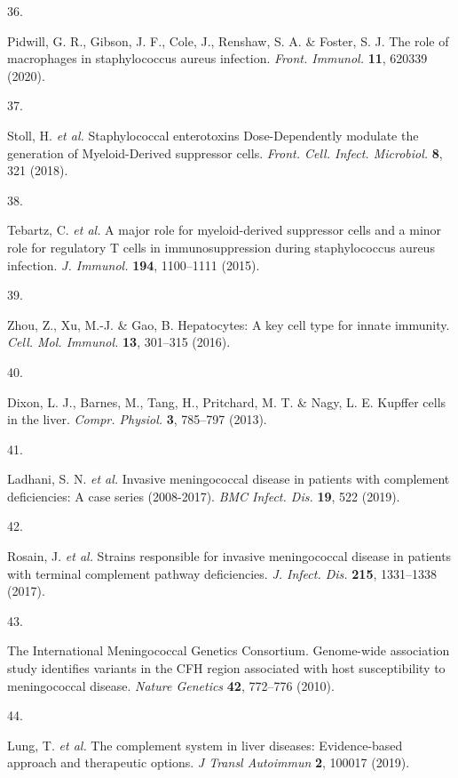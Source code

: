 \documentclass[
]{article}
\newlength{\cslhangindent}
\newlength{\csllabelwidth}
\newenvironment{CSLReferences}[2] %
 {\begin{list}{}{%
  \setlength{\itemindent}{0pt}
  \setlength{\leftmargin}{0pt}
  \setlength{\parsep}{0pt}
  \ifodd #1
   \setlength{\leftmargin}{\cslhangindent}
   \setlength{\itemindent}{-1\cslhangindent}
  \fi
  \setlength{\itemsep}{#2\baselineskip}}}
 {\end{list}}
\newcommand{\CSLLeftMargin}[1]{\parbox[t]{\csllabelwidth}{\strut#1\strut}}
\newcommand{\CSLRightInline}[1]{\parbox[t]{\linewidth - \csllabelwidth}{\strut#1\strut}}
\begin{document}
\begin{CSLReferences}{0}{0}
\CSLLeftMargin{36. }%
\CSLRightInline{Pidwill, G. R., Gibson, J. F., Cole, J., Renshaw, S. A.
\& Foster, S. J. The role of macrophages in staphylococcus aureus
infection. \emph{Front. Immunol.} \textbf{11}, 620339 (2020).}

\CSLLeftMargin{37. }%
\CSLRightInline{Stoll, H. \emph{et al.} Staphylococcal enterotoxins
{Dose-Dependently} modulate the generation of {Myeloid-Derived}
suppressor cells. \emph{Front. Cell. Infect. Microbiol.} \textbf{8}, 321
(2018).}

\CSLLeftMargin{38. }%
\CSLRightInline{Tebartz, C. \emph{et al.} A major role for
myeloid-derived suppressor cells and a minor role for regulatory {T}
cells in immunosuppression during staphylococcus aureus infection.
\emph{J. Immunol.} \textbf{194}, 1100--1111 (2015).}

\CSLLeftMargin{39. }%
\CSLRightInline{Zhou, Z., Xu, M.-J. \& Gao, B. Hepatocytes: A key cell
type for innate immunity. \emph{Cell. Mol. Immunol.} \textbf{13},
301--315 (2016).}

\CSLLeftMargin{40. }%
\CSLRightInline{Dixon, L. J., Barnes, M., Tang, H., Pritchard, M. T. \&
Nagy, L. E. Kupffer cells in the liver. \emph{Compr. Physiol.}
\textbf{3}, 785--797 (2013).}

\CSLLeftMargin{41. }%
\CSLRightInline{Ladhani, S. N. \emph{et al.} Invasive meningococcal
disease in patients with complement deficiencies: A case series
(2008-2017). \emph{BMC Infect. Dis.} \textbf{19}, 522 (2019).}

\CSLLeftMargin{42. }%
\CSLRightInline{Rosain, J. \emph{et al.} Strains responsible for
invasive meningococcal disease in patients with terminal complement
pathway deficiencies. \emph{J. Infect. Dis.} \textbf{215}, 1331--1338
(2017).}

\CSLLeftMargin{43. }%
\CSLRightInline{The International Meningococcal Genetics Consortium.
Genome-wide association study identifies variants in the {CFH} region
associated with host susceptibility to meningococcal disease.
\emph{Nature Genetics} \textbf{42}, 772--776 (2010).}

\CSLLeftMargin{44. }%
\CSLRightInline{Lung, T. \emph{et al.} The complement system in liver
diseases: Evidence-based approach and therapeutic options. \emph{J
Transl Autoimmun} \textbf{2}, 100017 (2019).}


\end{CSLReferences}
\end{document}
